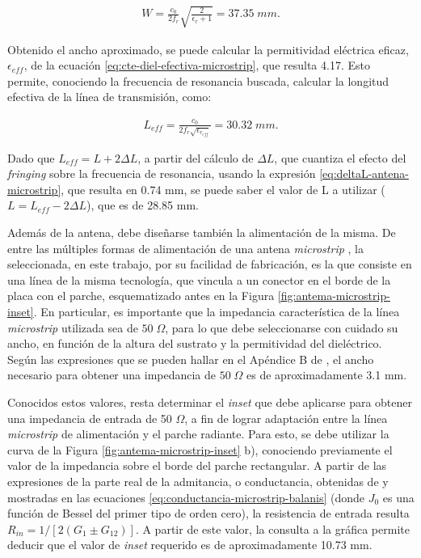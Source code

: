 \begin{align}
	W = \frac{c_0}{2 f_r} \sqrt{\frac{2}{\epsilon_r+1}} = 37.35\; mm.
\end{align}

Obtenido el ancho aproximado, se puede calcular la permitividad eléctrica eficaz, $\epsilon_{eff}$, de la ecuación \ref{eq:cte-diel-efectiva-microstrip}, que resulta 4.17. Esto permite, conociendo la frecuencia de resonancia buscada, calcular la longitud efectiva de la línea de transmisión, como:

\begin{align}
	L_{eff} = \frac{c_0}{2 f_r \sqrt{\epsilon_{r_{eff}}}} = 30.32\; mm.
\end{align}

Dado que $L_{eff} = L + 2 \Delta L$, a partir del cálculo de $\Delta L$, que cuantiza el efecto del \textit{fringing} sobre la frecuencia de resonancia, usando la expresión \ref{eq:deltaL-antena-microstrip}, que resulta en 0.74 mm, se puede saber el valor de L a utilizar ($L = L_{eff} - 2 \Delta L$), que es de 28.85 mm.

Además de la antena, debe diseñarse también la alimentación de la misma. De entre las múltiples formas de alimentación de una antena \textit{microstrip} \cite{Barthia:Handbook}, la seleccionada, en este trabajo, por su facilidad de fabricación, es la que consiste en una línea de la misma tecnología, que vincula a un conector en el borde de la placa con el parche, esquematizado antes en la Figura \ref{fig:antema-microstrip-inset}. En particular, es importante que la impedancia característica de la línea \textit{microstrip} utilizada sea de $50\;\Omega$, para lo que debe seleccionarse con cuidado su ancho, en función de la altura del sustrato y la permitividad del dieléctrico. Según las expresiones que se pueden hallar en el Apéndice B de \cite{Barthia:Handbook}, el ancho necesario para obtener una impedancia de $50\;\Omega$ es de aproximadamente 3.1 mm.

Conocidos estos valores, resta determinar el \textit{inset} que debe aplicarse para obtener una impedancia de entrada de 50 $\Omega$, a fin de lograr adaptación entre la línea \textit{microstrip} de alimentación y el parche radiante. Para esto, se debe utilizar la curva de la Figura \ref{fig:antema-microstrip-inset} b), conociendo previamente el valor de la impedancia sobre el borde del parche rectangular. A partir de las expresiones de la parte real de la admitancia, o conductancia, obtenidas de \cite{Balanis:Theory} y mostradas en las ecuaciones \ref{eq:conductancia-microstrip-balanis} (donde $J_0$ es una función de Bessel del primer tipo de orden cero), la resistencia de entrada resulta $R_{in} = 1/[2(G_1 \pm G_{12})]$. A partir de este valor, la consulta a la gráfica permite deducir que el valor de \textit{inset} requerido es de aproximadamente 10.73 mm.

